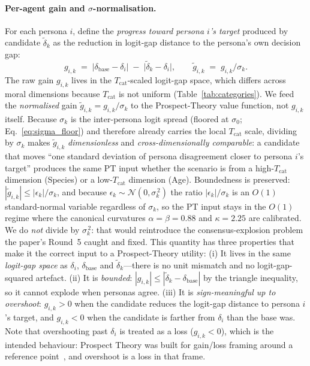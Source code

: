 \documentclass{article}
\begin{document}
\paragraph{Per-agent gain and $\sigma$-normalisation.}
For each persona $i$, define the \emph{progress toward persona $i$'s target}
produced by candidate $\tilde{\delta}_k$ as the reduction in logit-gap distance
to the persona's own decision gap:
\begin{equation}
  g_{i,k} \;=\; \bigl|\delta_{\text{base}} - \delta_i\bigr|
              \;-\; \bigl|\tilde{\delta}_k - \delta_i\bigr|,
  \qquad
  \tilde{g}_{i,k} \;=\; g_{i,k}\big/\sigma_k.
  \label{eq:agreement}
\end{equation}
The raw gain $g_{i,k}$ lives in the $T_{\text{cat}}$-scaled logit-gap space,
which differs across moral dimensions because $T_{\text{cat}}$ is not
uniform (Table~\ref{tab:categories}). We feed the \emph{normalised} gain
$\tilde{g}_{i,k} = g_{i,k}/\sigma_k$ to the Prospect-Theory value function,
not $g_{i,k}$ itself. Because $\sigma_k$ is the inter-persona logit spread
(floored at $\sigma_0$; Eq.~\ref{eq:sigma_floor}) and therefore already
carries the local $T_{\text{cat}}$ scale, dividing by $\sigma_k$ makes
$\tilde{g}_{i,k}$ \emph{dimensionless} and \emph{cross-dimensionally
comparable}: a candidate that moves ``one standard deviation of persona
disagreement closer to persona $i$'s target'' produces the same PT input
whether the scenario is from a high-$T_{\text{cat}}$ dimension (Species)
or a low-$T_{\text{cat}}$ dimension (Age). Boundedness is preserved:
$|\tilde{g}_{i,k}|\le|\epsilon_k|/\sigma_k$, and because $\epsilon_k\sim
\mathcal{N}(0,\sigma_k^{\,2})$ the ratio $|\epsilon_k|/\sigma_k$ is an
$O(1)$ standard-normal variable regardless of $\sigma_k$, so the PT input
stays in the $O(1)$ regime where the canonical curvatures
$\alpha{=}\beta{=}0.88$ and $\kappa{=}2.25$ are calibrated.
We do \emph{not} divide by $\sigma_k^{\,2}$: that would reintroduce the
consensus-explosion problem the paper's Round~5 caught and fixed.
This quantity has three properties that make it the correct input to a
Prospect-Theory utility:
(i) It lives in the same \emph{logit-gap space} as $\delta_i$, $\delta_{\text{base}}$
and $\tilde{\delta}_k$---there is no unit mismatch and no logit-gap-squared
artefact.
(ii) It is \emph{bounded}: $|g_{i,k}|\le|\tilde{\delta}_k - \delta_{\text{base}}|$
by the triangle inequality, so it cannot explode when personas agree.
(iii) It is \emph{sign-meaningful up to overshoot}: $g_{i,k}>0$ when the
candidate reduces the logit-gap distance to persona $i$'s target, and
$g_{i,k}<0$ when the candidate is farther from $\delta_i$ than the base was.
Note that overshooting past $\delta_i$ is treated as a loss ($g_{i,k}<0$),
which is the intended behaviour: Prospect Theory was built for gain/loss
framing around a reference point~\citep{kahneman1979prospect}, and overshoot
is a loss in that frame.
\end{document}
